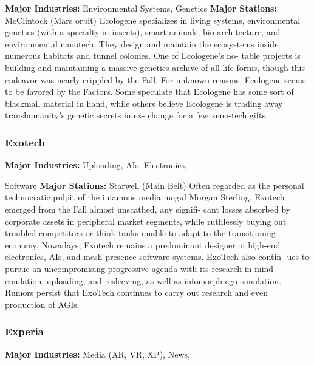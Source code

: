 \textbf{Major Industries:} Environmental Systems, Genetics
\textbf{Major Stations:} McClintock (Mars orbit)
Ecologene specializes in living systems, environmental 
genetics (with a specialty in insects), smart animals, 
bio-architecture, and environmental nanotech. They 
design and maintain the ecosystems inside numerous 
habitats and tunnel colonies. One of Ecologene's no-
table projects is building and maintaining a massive 
genetics archive of all life forms, though this endeavor 
was nearly crippled by the Fall. For unknown reasons, 
Ecologene seems to be favored by the Factors. Some 
speculate that Ecologene has some sort of blackmail 
material in hand, while others believe Ecologene is 
trading away transhumanity's genetic secrets in ex-
change for a few xeno-tech gifts.

\subsubsection{Exotech}

\textbf{Major Industries:} Uploading, AIs, Electronics, 

Software
\textbf{Major Stations:} Starwell (Main Belt)
Often regarded as the personal technocratic pulpit of 
the infamous media mogul Morgan Sterling, Exotech 
emerged from the Fall almost unscathed, any signifi-
cant losses absorbed by corporate assets in peripheral 
market segments, while ruthlessly buying out troubled 
competitors or think tanks unable to adapt to the 
transitioning economy. Nowadays, Exotech remains a 
predominant designer of high-end electronics, AIs, and 
mesh presence software systems. ExoTech also contin-
ues to pursue an uncompromising progressive agenda 
with its research in mind emulation, uploading, and 
resleeving, as well as infomorph ego simulation. 
Rumors persist that ExoTech continues to carry out 
research and even production of AGIs.

\subsubsection{Experia}

\textbf{Major Industries:} Media (AR, VR, XP), News, 

